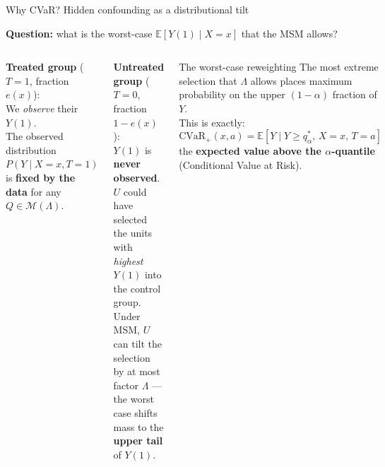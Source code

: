 \documentclass[aspectratio=169]{beamer}
\newcommand{\E}{\mathbb{E}}
\newcommand{\CVaR}{\mathrm{CVaR}}
\begin{document}

\begin{frame}{Why CVaR? Hidden confounding as a distributional tilt}

\textbf{Question:} what is the worst-case $\E[Y(1)\mid X=x]$ that the MSM allows?

\medskip
\begin{columns}
\textbf{Treated group} ($T=1$, fraction $e(x)$):\\
We \emph{observe} their $Y(1)$.\\
The observed distribution $P(Y\mid X=x, T=1)$ is \textbf{fixed by the data} for any $Q \in \mathcal{M}(\Lambda)$.

\smallskip
\textbf{Untreated group} ($T=0$, fraction $1-e(x)$):\\
$Y(1)$ is \textbf{never observed}.\\
$U$ could have selected the units with \emph{highest} $Y(1)$ into the control group.\\
Under MSM, $U$ can tilt the selection by at most factor $\Lambda$ --- the worst case shifts mass to the \textbf{upper tail} of $Y(1)$.

\begin{alertblock}{The worst-case reweighting}
The most extreme selection that $\Lambda$ allows places maximum probability on the upper $(1-\alpha)$ fraction of $Y$.\\[4pt]
This is exactly:
\[
  \CVaR_+(x,a) = \E[Y \mid Y \geq q^*_\alpha,\, X{=}x,\, T{=}a]
\]
the \textbf{expected value above the $\alpha$-quantile} (Conditional Value at Risk).
\end{alertblock}
\end{columns}
\end{frame}

\end{document}
